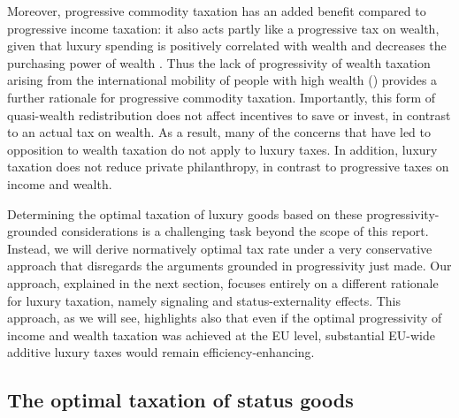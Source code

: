\documentclass{article}
\begin{document}
Moreover, progressive commodity taxation has an added benefit compared to progressive income taxation: it also acts partly like a progressive tax on wealth, given that luxury spending is positively correlated with wealth and decreases the purchasing power of wealth \citet{kaplow2008theory}.
Thus the lack of progressivity of wealth taxation arising from the international mobility of people with high wealth (\cite{agrawal2025wealth}) provides a further rationale for progressive commodity taxation. Importantly, this form of quasi-wealth redistribution does not affect incentives to save or invest, in contrast to an actual tax on wealth. As a result, many of the concerns that have led to opposition to wealth taxation %
do not apply to luxury taxes. In addition, luxury taxation does not reduce private philanthropy, in contrast to progressive taxes on income and wealth.

Determining the optimal taxation of luxury goods based on these progressivity-grounded considerations is a challenging task beyond the scope of this report. Instead, we will derive normatively optimal tax rate under a very conservative approach %
that disregards the arguments grounded in progressivity just made. Our approach, explained in the next section, focuses entirely on a different rationale for luxury taxation, namely signaling and status-externality effects. This approach, as we will see, highlights also that even if the optimal progressivity of income and wealth taxation was achieved at the EU level, substantial EU-wide additive luxury taxes would remain efficiency-enhancing. 


\subsection{The optimal taxation of status goods}
\end{document}

